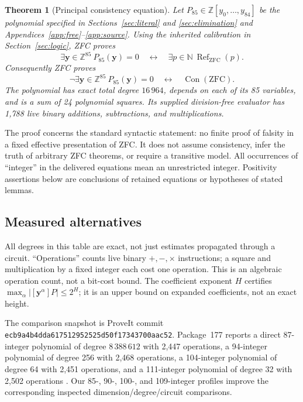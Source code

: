 \documentclass[11pt]{article}
\newtheorem{theorem}{Theorem}[section]
\theoremstyle{definition}\newtheorem{definition}[theorem]{Definition}
\theoremstyle{remark}\newtheorem{remark}[theorem]{Remark}
\newcommand{\Z}{\mathbb Z}\newcommand{\N}{\mathbb N}
\newcommand{\Con}{\operatorname{Con}}\newcommand{\ZFC}{\mathrm{ZFC}}
\newcommand{\Refut}{\operatorname{Ref}}\newcommand{\degp}{\operatorname{deg}}
\begin{document}
\begin{theorem}[Principal consistency equation]
\label{thm:main}
Let $P_{85}\in\Z[y_0,\ldots,y_{84}]$ be the polynomial specified in
Sections~\ref{sec:literal} and \ref{sec:elimination} and
Appendices~\ref{app:free}--\ref{app:source}.
Using the inherited calibration in Section~\ref{sec:logic}, ZFC proves
\[
 \exists\boldsymbol y\in\Z^{85}\ P_{85}(\boldsymbol y)=0
 \quad\longleftrightarrow\quad
 \exists p\in\N\ \Refut_{\ZFC}(p).
\]
Consequently ZFC proves
\[
 \neg\exists\boldsymbol y\in\Z^{85}\ P_{85}(\boldsymbol y)=0
 \quad\longleftrightarrow\quad\Con(\ZFC).
\]
The polynomial has exact total degree $16\,964$, depends on each of its
85 variables, and is a sum of 24 polynomial squares. Its supplied
division-free evaluator has 1,788 live binary additions, subtractions,
and multiplications.
\end{theorem}

The proof concerns the standard syntactic statement: no finite proof of
falsity in a fixed effective presentation of ZFC. It does not assume
consistency, infer the truth of arbitrary ZFC theorems, or require a
transitive model. All occurrences of ``integer'' in the delivered
equations mean an unrestricted integer. Positivity assertions below are
conclusions of retained equations or hypotheses of stated lemmas.

\subsection{Measured alternatives}

All degrees in this table are exact, not just estimates propagated
through a circuit. ``Operations'' counts live binary $+,-,\times$
instructions; a square and multiplication by a fixed integer each cost
one operation. This is an algebraic operation count, not a bit-cost
bound. The coefficient exponent $H$ certifies
$\max_{\alpha}|[\boldsymbol y^{\alpha}]P|\leq 2^H$; it is an upper
bound on expanded coefficients, not an exact height.

The comparison snapshot is ProveIt commit
\texttt{ecb9a4b4dda617512952525d50f17343700aac52}. Package~177
reports a direct 87-integer polynomial of degree $8\,388\,612$ with
2,447 operations, a 94-integer polynomial of degree 256 with 2,468
operations, a 104-integer polynomial of degree 64 with 2,451 operations,
and a 111-integer polynomial of degree 32 with 2,502 operations
\cite{p177}. Our 85-, 90-, 100-, and 109-integer profiles improve the
corresponding inspected dimension/degree/circuit comparisons.
\end{document}
